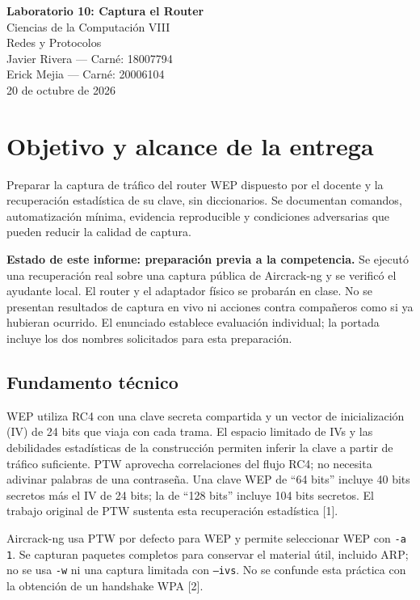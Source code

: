 \documentclass[11pt,a4paper]{article}
\newcommand{\carneJose}{18007794}
\newcommand{\carneErick}{20006104}
\begin{document}
\begin{center}
{\Large\textbf{Laboratorio 10: Captura el Router}}\\[4pt]
{\large Ciencias de la Computación VIII}\\
Redes y Protocolos\\[12pt]
Javier Rivera --- Carné: \carneJose\\[7pt]
Erick Mejia --- Carné: \carneErick\\[10pt]
20 de octubre de 2026
\end{center}

\section{Objetivo y alcance de la entrega}
Preparar la captura de tráfico del router WEP dispuesto por el docente y la
recuperación estadística de su clave, sin diccionarios. Se documentan comandos,
automatización mínima, evidencia reproducible y condiciones adversarias que
pueden reducir la calidad de captura.

\textbf{Estado de este informe: preparación previa a la competencia.} Se ejecutó
una recuperación real sobre una captura pública de Aircrack-ng y se verificó el
ayudante local. El router y el adaptador físico se probarán en clase. No se
presentan resultados de captura en vivo ni acciones contra compañeros como si
ya hubieran ocurrido. El enunciado establece evaluación individual; la portada
incluye los dos nombres solicitados para esta preparación.

\subsection*{Fundamento técnico}
WEP utiliza RC4 con una clave secreta compartida y un vector de inicialización
(IV) de 24 bits que viaja con cada trama. El espacio limitado de IVs y las
debilidades estadísticas de la construcción permiten inferir la clave a partir
de tráfico suficiente. PTW aprovecha correlaciones del flujo RC4; no necesita
adivinar palabras de una contraseña. Una clave WEP de ``64 bits'' incluye
40 bits secretos más el IV de 24 bits; la de ``128 bits'' incluye 104 bits
secretos. El trabajo original de PTW sustenta esta recuperación estadística [1].

Aircrack-ng usa PTW por defecto para WEP y permite seleccionar WEP con
\texttt{-a 1}. Se capturan paquetes completos para conservar el material útil,
incluido ARP; no se usa \texttt{-w} ni una captura limitada con \texttt{--ivs}.
No se confunde esta práctica con la obtención de un handshake WPA [2].
\end{document}
